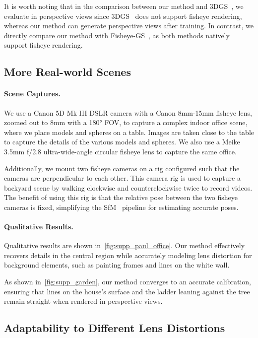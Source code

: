 It is worth noting that in the comparison between our method and 3DGS~\cite{kerbl20233d}, we evaluate in perspective views since 3DGS~\cite{kerbl20233d} does not support fisheye rendering, whereas our method can generate perspective views after training. In contrast, we directly compare our method with Fisheye-GS~\cite{liao2024fisheye}, as both methods natively support fisheye rendering.

\subsection{More Real-world Scenes}
\paragraph{Scene Captures.}
We use a Canon 5D Mk III DSLR camera with a Canon 8mm-15mm fisheye lens, zoomed out to 8mm with a 180\si{\degree} FOV, to capture a complex indoor office scene, where we place models and spheres on a table. Images are taken close to the table to capture the details of the various models and spheres. We also use a Meike 3.5mm f/2.8 ultra-wide-angle circular fisheye lens to capture the same office. 

Additionally, we mount two fisheye cameras on a rig configured such that the cameras are perpendicular to each other. This camera rig is used to capture a backyard scene by walking clockwise and counterclockwise twice to record videos. The benefit of using this rig is that the relative pose between the two fisheye cameras is fixed, simplifying the SfM~\cite{schoenberger2016sfm} pipeline for estimating accurate poses.

\paragraph{Qualitative Results.}
Qualitative results are shown in~\cref{fig:supp_paul_office}. Our method effectively recovers details in the central region while accurately modeling lens distortion for background elements, such as painting frames and lines on the white wall.

As shown in~\cref{fig:supp_garden}, our method converges to an accurate calibration, ensuring that lines on the house's surface and the ladder leaning against the tree remain straight when rendered in perspective views.


\subsection{Adaptability to Different Lens Distortions}

